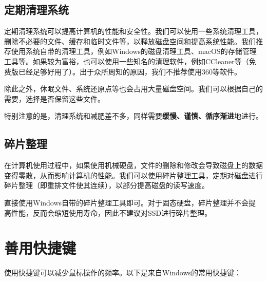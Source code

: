 \documentclass[../main.tex]{subfiles}
\begin{document}
\subsection{定期清理系统}

定期清理系统可以提高计算机的性能和安全性。我们可以使用一些系统清理工具，删除不必要的文件、缓存和临时文件等，以释放磁盘空间和提高系统性能。我们推荐使用系统自带的清理工具，例如Windows的磁盘清理工具、macOS的存储管理工具等。如果较为富裕，也可以使用一些知名的清理软件，例如CCleaner等（免费版已经足够好用了）。出于众所周知的原因，我们不推荐使用360等软件。

除此之外，休眠文件、系统还原点等也会占用大量磁盘空间。我们可以根据自己的需要，选择是否保留这些文件。

特别注意的是，清理系统和减肥差不多，同样需要\textbf{缓慢、谨慎、循序渐进}地进行。

\subsection{碎片整理}

在计算机使用过程中，如果使用机械硬盘，文件的删除和修改会导致磁盘上的数据变得零散，从而影响计算机的性能。我们可以使用碎片整理工具，定期对磁盘进行碎片整理（即重排文件使其连续），以部分提高磁盘的读写速度。

直接使用Windows自带的碎片整理工具即可。对于固态硬盘，碎片整理并不会提高性能，反而会缩短使用寿命，因此不建议对SSD进行碎片整理。

\section{善用快捷键}

使用快捷键可以减少鼠标操作的频率。以下是来自Windows的常用快捷键：
\end{document}
